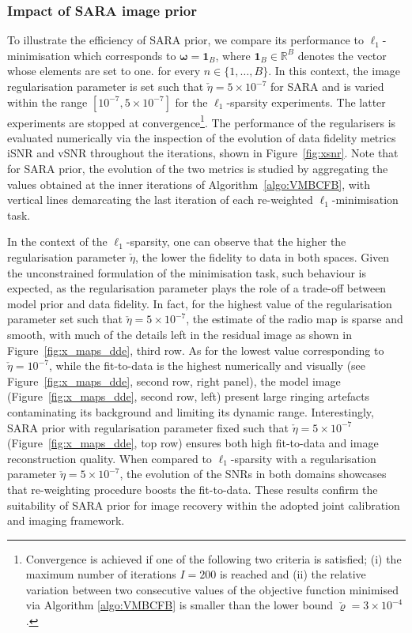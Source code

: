 \documentclass[fleqn,usenatbib]{mnras}
\newcommand{\eR}{\mathbb{R}}
\begin{document}
\subsubsection*{Impact of SARA image prior}%
To illustrate the efficiency of SARA prior, we compare its performance to $\ell_1$-minimisation {which corresponds to ${\boldsymbol\omega}= \mathbf{1}_{B}$, where $\mathbf{1}_{B}\in \eR^{B}$ denotes the vector whose elements are set to one.} for every $n \in \{1,\dots,B\}$. In this context, the image regularisation parameter is set such that $\check{\eta} =5\times 10^{-7}$ for SARA and is varied within the range $[ 10^{-7}, 5\times10^{-7}]$ for the $\ell_1$-sparsity experiments. The latter experiments are stopped at convergence\footnote{Convergence is achieved if one of the following two criteria is satisfied; (i) the maximum number of iterations $I=200$ is reached and (ii) the relative variation between two consecutive values of the
objective function minimised via Algorithm \ref{algo:VMBCFB} is smaller than the lower bound $\check{\varrho}=3\times 10^{-4}$. }. The performance of the regularisers is evaluated numerically via the inspection of the evolution of data fidelity metrics iSNR and vSNR throughout the iterations, shown in Figure~\ref{fig:xsnr}. Note that for SARA prior, the evolution of the two metrics is studied by aggregating the values obtained at the inner iterations of Algorithm~\ref{algo:VMBCFB}, with vertical lines demarcating the last iteration of each re-weighted $\ell_1$-minimisation task.

In the context of the $\ell_1$-sparsity, one can observe that the higher the regularisation parameter $\check{\eta} $, the lower the fidelity to data in both spaces. Given the unconstrained formulation of the minimisation task, such behaviour is expected, as the regularisation parameter plays the role of a trade-off between model prior and data fidelity. In fact, for the highest value of the regularisation parameter set such that $\check{\eta} =5\times10^{-7}$, the estimate of the radio map is sparse and smooth, with much of the details left in the residual image as shown in Figure~\ref{fig:x_maps_dde}, third row. As for the lowest value corresponding to $\check{\eta} =10^{-7}$, while the fit-to-data is the highest numerically and visually (see Figure~\ref{fig:x_maps_dde}, second row, right panel), the model image (Figure~\ref{fig:x_maps_dde}, second row, left) present large ringing artefacts contaminating its background and limiting its dynamic range. Interestingly, SARA prior with regularisation parameter fixed such that $\check{\eta}=5\times 10^{-7}$ (Figure~\ref{fig:x_maps_dde}, top row) ensures both high fit-to-data and image reconstruction quality. When compared to $\ell_1$-sparsity with a regularisation parameter $\check{\eta} =5 \times 10^{-7}$, the evolution of the SNRs in both domains showcases that re-weighting procedure boosts the fit-to-data. These results confirm the suitability of SARA prior for image recovery within the adopted joint calibration and imaging framework. 
\end{document}
